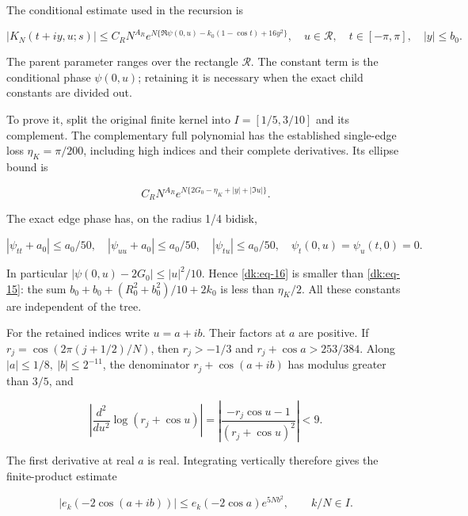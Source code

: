 The conditional estimate used in the recursion is

\begin{equation}\label{dk:eq-15}
|K_N(t+iy,u;s)|\le C_RN^{A_R}
 e^{N\{\Re\psi(0,u)-k_0(1-\cos t)+16y^2\}},
 \quad u\in\mathcal R,\quad t\in[-\pi,\pi],\quad |y|\le b_0.
\end{equation}

The parent parameter ranges over the rectangle \(\mathcal R\).
The constant term is the conditional phase \(\psi(0,u)\);
retaining it is necessary when the exact child constants are divided out.

To prove it, split the original finite kernel into
\(I=[1/5,3/10]\) and its complement. The complementary full polynomial
has the established single-edge loss \(\eta_K=\pi/200\), including high
indices and their complete derivatives. Its ellipse bound is

\begin{equation}\label{dk:eq-16}
C_RN^{A_R}
       e^{N\{2G_0-\eta_K+|y|+|\Im u|\}}.
\end{equation}

The exact edge phase has, on the radius 1/4 bidisk,

\begin{equation}\label{dk:eq-17}
|\psi_{tt}+a_0|\le a_0/50,
 \quad |\psi_{uu}+a_0|\le a_0/50,
 \quad |\psi_{tu}|\le a_0/50,
 \quad \psi_t(0,u)=\psi_u(t,0)=0.
\end{equation}

In particular \(|\psi(0,u)-2G_0|\le |u|^2/10\). Hence \eqref{dk:eq-16} is smaller
than \eqref{dk:eq-15}: the sum \(b_0+b_0+(R_0^2+b_0^2)/10+2k_0\) is less
than \(\eta_K/2\). All these constants are independent of the tree.

For the retained indices write \(u=a+ib\). Their factors at \(a\) are positive.
If \(r_j=\cos(2\pi(j+1/2)/N)\), then \(r_j>-1/3\) and
\(r_j+\cos a>253/384\). Along \(|a|\le1/8,\ |b|\le2^{-11}\), the denominator
\(r_j+\cos(a+ib)\) has modulus greater than \(3/5\), and

\begin{equation}\label{dk:eq-18}
\left|\frac{d^2}{du^2}\log(r_j+\cos u)\right|
 =\left|\frac{-r_j\cos u-1}{(r_j+\cos u)^2}\right|<9.
\end{equation}

The first derivative at real $a$ is real. Integrating vertically therefore
gives the finite-product estimate

\begin{equation}\label{dk:eq-19}
|e_k(-2\cos(a+ib))|
       \le e_k(-2\cos a)e^{5Nb^2},\qquad k/N\in I.
\end{equation}

